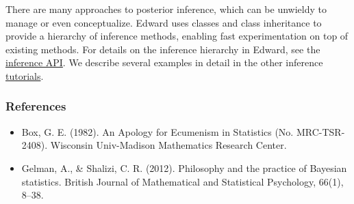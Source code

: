 There are many approaches to posterior inference, which can be unwieldy to
manage or even conceptualize. Edward uses classes and class
inheritance to provide a hierarchy of inference methods, enabling fast
experimentation on top of existing methods. For details on the inference
hierarchy in Edward, see the
\href{api/inferences.html}{inference API}. We describe several examples in
detail in the other inference \href{tutorials.html}{tutorials}.


\subsubsection{References}\label{references}

\begin{itemize}
\item
  Box, G. E. (1982). An Apology for Ecumenism in Statistics (No.
  MRC-TSR-2408). Wisconsin Univ-Madison Mathematics Research Center.
\item
  Gelman, A., & Shalizi, C. R. (2012). Philosophy and the practice of
  Bayesian statistics. British Journal of Mathematical and Statistical
  Psychology, 66(1), 8–38.
\end{itemize}
